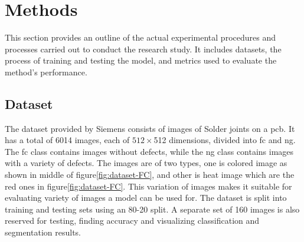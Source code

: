 \section{Methods}

This section provides an outline of the actual experimental procedures and processes carried out to conduct the research study. It includes datasets, the process of training and testing the model, and metrics used to evaluate the method's performance.

\subsection{Dataset}
The dataset provided by Siemens consists of images of Solder joints on a \gls{pcb}. It has a total of 6014 images, each of $512 \times $512 dimensions, divided into \gls{fc} and \gls{ng}. The \gls{fc} class contains images without defects, while the \gls{ng} class contains images with a variety of defects. The images are of two types, one is colored image as shown in middle of figure\ref{fig:dataset-FC}, and other is heat image which are the red ones in figure\ref{fig:dataset-FC}. This variation of images makes it suitable for evaluating variety of images a model can be used for. The dataset is split into training and testing sets using an 80-20 split. A separate set of 160 images is also reserved for testing, finding accuracy and visualizing classification and segmentation results.

